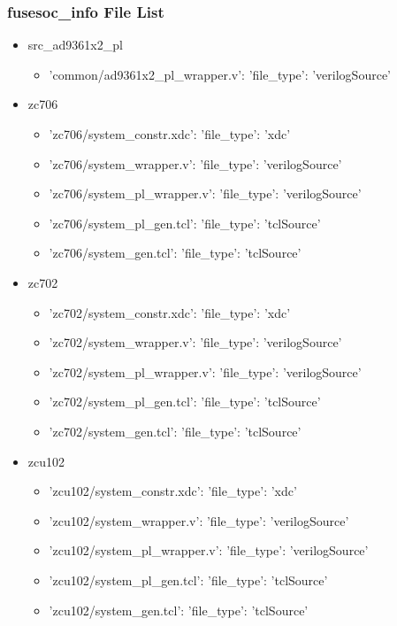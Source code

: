 \subsubsection{fusesoc\_info File List}
\begin{itemize}
\item src\_ad9361x2\_pl
	\begin{itemize}
	\item {'common/ad9361x2\_pl\_wrapper.v': {'file\_type': 'verilogSource'}}
	\end{itemize}
\item zc706
	\begin{itemize}
	\item {'zc706/system\_constr.xdc': {'file\_type': 'xdc'}}
	\item {'zc706/system\_wrapper.v': {'file\_type': 'verilogSource'}}
	\item {'zc706/system\_pl\_wrapper.v': {'file\_type': 'verilogSource'}}
	\item {'zc706/system\_pl\_gen.tcl': {'file\_type': 'tclSource'}}
	\item {'zc706/system\_gen.tcl': {'file\_type': 'tclSource'}}
	\end{itemize}
\item zc702
	\begin{itemize}
	\item {'zc702/system\_constr.xdc': {'file\_type': 'xdc'}}
	\item {'zc702/system\_wrapper.v': {'file\_type': 'verilogSource'}}
	\item {'zc702/system\_pl\_wrapper.v': {'file\_type': 'verilogSource'}}
	\item {'zc702/system\_pl\_gen.tcl': {'file\_type': 'tclSource'}}
	\item {'zc702/system\_gen.tcl': {'file\_type': 'tclSource'}}
	\end{itemize}
\item zcu102
	\begin{itemize}
	\item {'zcu102/system\_constr.xdc': {'file\_type': 'xdc'}}
	\item {'zcu102/system\_wrapper.v': {'file\_type': 'verilogSource'}}
	\item {'zcu102/system\_pl\_wrapper.v': {'file\_type': 'verilogSource'}}
	\item {'zcu102/system\_pl\_gen.tcl': {'file\_type': 'tclSource'}}
	\item {'zcu102/system\_gen.tcl': {'file\_type': 'tclSource'}}
	\end{itemize}
\end{itemize}
